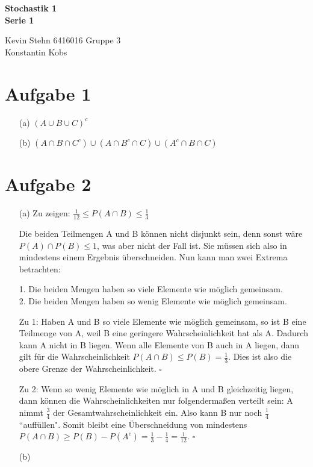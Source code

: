 \documentclass[10pt,a4paper]{article}
\begin{document}
\begin{center}
\textbf{Stochastik 1 \\ Serie 1 \\}
\end{center}

\begin{flushright}
Kevin Stehn 6416016 Gruppe 3 \\
Konstantin Kobs
\end{flushright}

\section*{Aufgabe 1}
\begin{itemize}
\item[(a)] $(A \cup B \cup C)^{c}$
\item[(b)] 
$(A \cap B \cap C^{c}) \cup (A \cap B^{c} \cap C) \cup (A^{c} \cap B \cap C)$
\end{itemize}

\section*{Aufgabe 2}
\begin{itemize}
\item[(a)]
Zu zeigen: $\frac{1}{12} \leq P(A \cap B) \leq \frac{1}{3}$

Die beiden Teilmengen A und B können nicht disjunkt sein, denn sonst wäre $P(A) \cap P(B) \leq 1$, was aber nicht der Fall ist. Sie müssen sich also in mindestens einem Ergebnis überschneiden. Nun kann man zwei Extrema betrachten:

1. Die beiden Mengen haben so viele Elemente wie möglich gemeinsam.\\
2. Die beiden Mengen haben so wenig Elemente wie möglich gemeinsam.

Zu 1: Haben A und B so viele Elemente wie möglich gemeinsam, so ist B eine Teilmenge von A, weil B eine geringere Wahrscheinlichkeit hat als A. Dadurch kann A nicht in B liegen. Wenn alle Elemente von B auch in A liegen, dann gilt für die Wahrscheinlichkeit $P(A \cap B) \leq P(B) = \frac{1}{3}$. Dies ist also die obere Grenze der Wahrscheinlichkeit. $\square$

Zu 2: Wenn so wenig Elemente wie möglich in A und B gleichzeitig liegen, dann können die Wahrscheinlichkeiten nur folgendermaßen verteilt sein:
A nimmt $\frac{3}{4}$ der Gesamtwahrscheinlichkeit ein. Also kann B nur noch $\frac{1}{4}$ ``auffüllen". Somit bleibt eine Überschneidung von mindestens $P(A \cap B) \geq P(B) - P(A^c) = \frac{1}{3} - \frac{1}{4} = \frac{1}{12}$. $\square$

\item[(b)]
\end{itemize}
\end{document}
